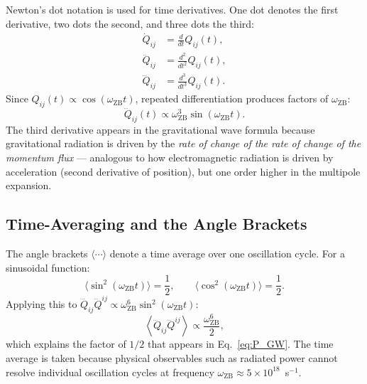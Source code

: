 \documentclass[%
 reprint, amsmath,amssymb, aps, prb, ]{revtex4-2}
\numberwithin{equation}{section}
\newcommand{\omZB}{\omega_{\text{ZB}}}
\begin{document}
Newton's dot notation is used for time derivatives.
One dot denotes the first derivative, two dots the second, and three dots the third:
\begin{align}
\dot{Q}_{ij} &= \frac{d}{dt}Q_{ij}(t), \\
\ddot{Q}_{ij} &= \frac{d^2}{dt^2}Q_{ij}(t), \\
\dddot{Q}_{ij} &= \frac{d^3}{dt^3}Q_{ij}(t).
\end{align}
Since $Q_{ij}(t) \propto \cos(\omZB t)$, repeated differentiation produces factors of $\omZB$:
\begin{equation}
\dddot{Q}_{ij}(t) \propto \omZB^3\sin(\omZB t).
\end{equation}
The third derivative appears in the gravitational wave formula because gravitational radiation is driven by the \emph{rate of change of the rate of change of the momentum flux} --- analogous to how electromagnetic radiation is driven by acceleration (second derivative of position), but one order higher in the multipole expansion.

\subsection{Time-Averaging and the Angle Brackets}

The angle brackets $\langle\cdots\rangle$ denote a time average over one oscillation cycle.
For a sinusoidal function:
\begin{equation}
\langle \sin^2(\omZB t) \rangle = \frac{1}{2}, \qquad \langle \cos^2(\omZB t) \rangle = \frac{1}{2}.
\end{equation}
Applying this to $\dddot{Q}_{ij}\dddot{Q}^{ij} \propto \omZB^6\sin^2(\omZB t)$:
\begin{equation}
\left\langle\dddot{Q}_{ij}\dddot{Q}^{ij}\right\rangle \propto \frac{\omZB^6}{2},
\end{equation}
which explains the factor of $1/2$ that appears in Eq.~\eqref{eq:P_GW}.
The time average is taken because physical observables such as radiated power cannot resolve individual oscillation cycles at frequency $\omZB \approx 5\times10^{18}$~s$^{-1}$.
\end{document}
